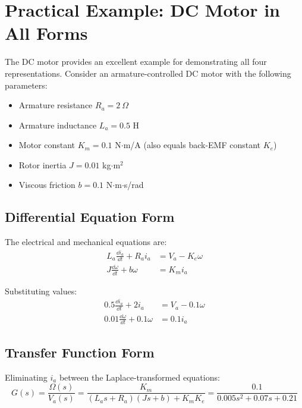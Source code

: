 \section{Practical Example: DC Motor in All Forms}
\label{sec:dc_motor_example}

The DC motor provides an excellent example for demonstrating all four representations. Consider an armature-controlled DC motor with the following parameters:
\begin{itemize}
    \item Armature resistance $R_a = 2\ \Omega$
    \item Armature inductance $L_a = 0.5$ H
    \item Motor constant $K_m = 0.1$ N$\cdot$m/A (also equals back-EMF constant $K_e$)
    \item Rotor inertia $J = 0.01$ kg$\cdot$m$^2$
    \item Viscous friction $b = 0.1$ N$\cdot$m$\cdot$s/rad
\end{itemize}

\subsection{Differential Equation Form}

The electrical and mechanical equations are:
\begin{align}
L_a\frac{\dd i_a}{\dd t} + R_a i_a &= V_a - K_e\omega \\
J\frac{\dd \omega}{\dd t} + b\omega &= K_m i_a
\end{align}

Substituting values:
\begin{align}
0.5\frac{\dd i_a}{\dd t} + 2i_a &= V_a - 0.1\omega \\
0.01\frac{\dd \omega}{\dd t} + 0.1\omega &= 0.1 i_a
\end{align}

\subsection{Transfer Function Form}

Eliminating $i_a$ between the Laplace-transformed equations:
\begin{equation}
G(s) = \frac{\Omega(s)}{V_a(s)} = \frac{K_m}{(L_a s + R_a)(Js + b) + K_m K_e} = \frac{0.1}{0.005s^2 + 0.07s + 0.21}
\end{equation}

